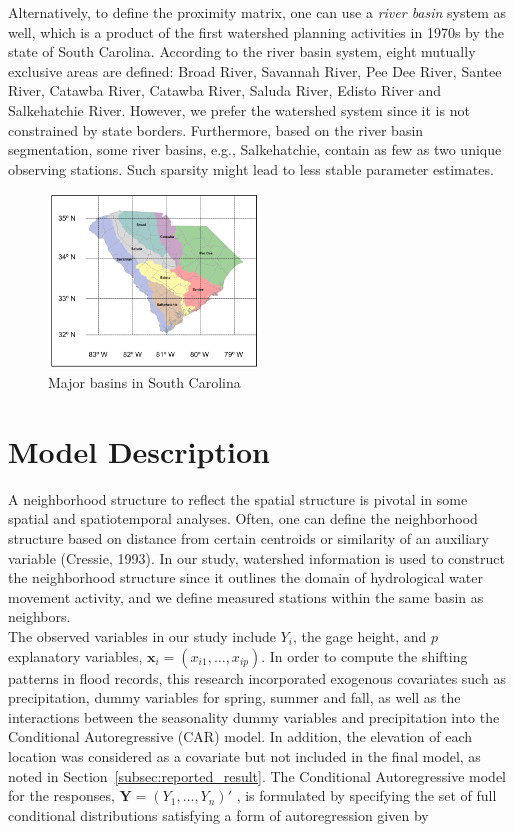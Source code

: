 \documentclass{svjour3}
\renewcommand\hl[1]{#1}
\begin{document}
Alternatively, to define the proximity matrix, one can use a \emph{river basin} system as well, which is a product of the first watershed planning activities in 1970s by the state of South Carolina.
According to the river basin system, eight mutually exclusive areas are defined: Broad River, Savannah River, Pee Dee River, Santee River, Catawba River, Catawba River, Saluda River, Edisto River and Salkehatchie River.
 However, we prefer the watershed system since it is not constrained by state borders.
 Furthermore, based on the river basin  segmentation, some river basins, e.g., Salkehatchie, contain as few as two unique observing stations.
 Such sparsity might lead to less stable parameter estimates.

\begin{figure}[htbp]
\begin{center}
\includegraphics[width=0.5\textwidth]{../images/basin_areas_in_sc.png}
\caption{\hl{Major basins in South Carolina}}
\label{fig:river_basins_}
\end{center}
\end{figure}

\section{Model Description}\label{sec:model}

A neighborhood structure to reflect the spatial structure is pivotal in some spatial and spatiotemporal analyses.
Often, one can define the neighborhood structure based on distance from certain centroids or similarity of an auxiliary variable (Cressie, 1993).
In our study, watershed information is used  to construct the neighborhood structure since it outlines the domain of hydrological water movement activity, and we define  measured stations within the same basin as neighbors. \\

The observed variables in our study include $ Y_i$, the gage height, and $ p$ explanatory variables, $ \mathbf x_i = (x_{i1}, \ldots, x_{ip})$.
In order to compute the shifting patterns in flood records, this research incorporated exogenous covariates such as precipitation, dummy variables for spring, summer and fall, as well as the interactions between the seasonality dummy variables and precipitation into the Conditional Autoregressive (CAR) model.
In addition,  the elevation of each location was considered as a covariate but not included in the final model, as noted in Section~\ref{subsec:reported_result}.
The Conditional Autoregressive  model for the responses, $\mathbf Y = (Y_1, \ldots, Y_n )'$ , is formulated by specifying the set of full conditional distributions satisfying a form of autoregression given by
\end{document}
